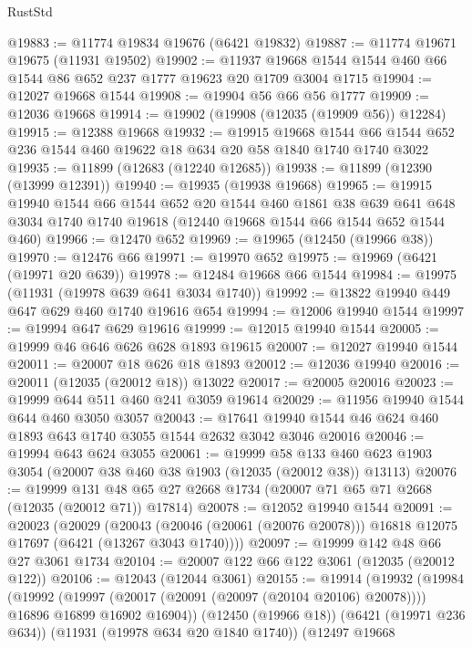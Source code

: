 \begin{lexlean}{RustStd}
\begin{coremodule}
@19883 := @11774 @19834 @19676 (@6421 @19832)
@19887 := @11774 @19671 @19675 (@11931 @19502)
@19902 := @11937 @19668 @1544 @1544 @460 @66 @1544 @86 @652 @237 @1777 @19623 @20 @1709 @3004 @1715
@19904 := @12027 @19668 @1544
@19908 := @19904 @56 @66 @56 @1777
@19909 := @12036 @19668
@19914 := @19902 (@19908 (@12035 (@19909 @56)) @12284)
@19915 := @12388 @19668
@19932 := @19915
    @19668
    @1544
    @66
    @1544
    @652
    @236
    @1544
    @460
    @19622
    @18
    @634
    @20
    @58
    @1840
    @1740
    @1740
    @3022
@19935 := @11899 (@12683 (@12240 @12685))
@19938 := @11899 (@12390 (@13999 @12391))
@19940 := @19935 (@19938 @19668)
@19965 := @19915
    @19940
    @1544
    @66
    @1544
    @652
    @20
    @1544
    @460
    @1861
    @38
    @639
    @641
    @648
    @3034
    @1740
    @1740
    @19618
    (@12440 @19668 @1544 @66 @1544 @652 @1544 @460)
@19966 := @12470 @652
@19969 := @19965 (@12450 (@19966 @38))
@19970 := @12476 @66
@19971 := @19970 @652
@19975 := @19969 (@6421 (@19971 @20 @639))
@19978 := @12484 @19668 @66 @1544
@19984 := @19975 (@11931 (@19978 @639 @641 @3034 @1740))
@19992 := @13822 @19940 @449 @647 @629 @460 @1740 @19616 @654
@19994 := @12006 @19940 @1544
@19997 := @19994 @647 @629 @19616
@19999 := @12015 @19940 @1544
@20005 := @19999 @46 @646 @626 @628 @1893 @19615
@20007 := @12027 @19940 @1544
@20011 := @20007 @18 @626 @18 @1893
@20012 := @12036 @19940
@20016 := @20011 (@12035 (@20012 @18)) @13022
@20017 := @20005 @20016
@20023 := @19999 @644 @511 @460 @241 @3059 @19614
@20029 := @11956 @19940 @1544 @644 @460 @3050 @3057
@20043 := @17641 @19940 @1544 @46 @624 @460 @1893 @643 @1740 @3055 @1544 @2632 @3042 @3046 @20016
@20046 := @19994 @643 @624 @3055
@20061 := @19999
    @58
    @133
    @460
    @623
    @1903
    @3054
    (@20007 @38 @460 @38 @1903 (@12035 (@20012 @38)) @13113)
@20076 := @19999
    @131
    @48
    @65
    @27
    @2668
    @1734
    (@20007 @71 @65 @71 @2668 (@12035 (@20012 @71)) @17814)
@20078 := @12052 @19940 @1544
@20091 := @20023
    (@20029
      (@20043 (@20046 (@20061 (@20076 @20078))) @16818 @12075 @17697 (@6421 (@13267 @3043 @1740))))
@20097 := @19999 @142 @48 @66 @27 @3061 @1734
@20104 := @20007 @122 @66 @122 @3061 (@12035 (@20012 @122))
@20106 := @12043 (@12044 @3061)
@20155 := @19914
    (@19932
      (@19984
        (@19992
          (@19997 (@20017 (@20091 (@20097 (@20104 @20106) @20078))))
          @16896
          @16899
          @16902
          @16904))
      (@12450 (@19966 @18))
      (@6421 (@19971 @236 @634))
      (@11931 (@19978 @634 @20 @1840 @1740))
      (@12497
        @19668

\end{coremodule}
\end{lexlean}
